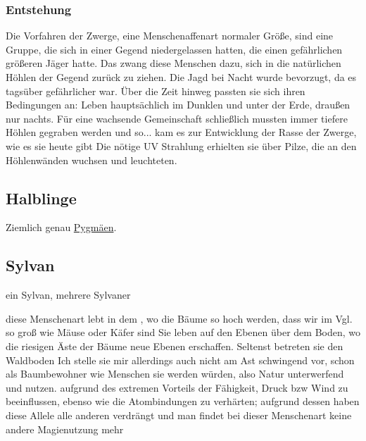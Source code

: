 


\subsubsection{Entstehung}
Die Vorfahren der Zwerge, eine Menschenaffenart normaler Größe, sind eine Gruppe, die sich in einer Gegend niedergelassen hatten, die einen gefährlichen größeren Jäger hatte. 
Das zwang diese Menschen dazu, sich in die natürlichen Höhlen der Gegend zurück zu ziehen. 
Die Jagd bei Nacht wurde bevorzugt, da es tagsüber gefährlicher war. 
Über die Zeit hinweg passten sie sich ihren Bedingungen an: 
Leben hauptsächlich im Dunklen und unter der Erde, draußen nur nachts. 
Für eine wachsende Gemeinschaft schließlich mussten immer tiefere Höhlen gegraben werden und so... kam es zur Entwicklung der Rasse der Zwerge, wie es sie heute gibt
Die nötige UV Strahlung erhielten sie über Pilze, die an den Höhlenwänden wuchsen und leuchteten.



\subsection{Halblinge} \label{rasse:halbling}
Ziemlich genau \href{https://de.wikipedia.org/wiki/Pygm\%C3\%A4en}{Pygmäen}.


\subsection{Sylvan} \label{rasse:sylvan}
ein Sylvan, mehrere Sylvaner
\begin{outline}
	\1 diese Menschenart lebt in dem , wo die Bäume so hoch werden, dass wir im Vgl. so groß wie Mäuse oder Käfer sind
	\1 Sie leben auf den Ebenen über dem Boden, wo die riesigen Äste der Bäume neue Ebenen erschaffen. Seltenst betreten sie den Waldboden
	\1 Ich stelle sie mir allerdings auch nicht am Ast schwingend vor, schon als Baumbewohner wie Menschen sie werden würden, also Natur unterwerfend und nutzen.
	\1 aufgrund des extremen Vorteils der Fähigkeit, Druck bzw Wind zu beeinflussen, ebenso wie die Atombindungen zu verhärten; aufgrund dessen haben diese Allele alle anderen verdrängt und man findet bei dieser Menschenart keine andere Magienutzung mehr
\end{outline}

